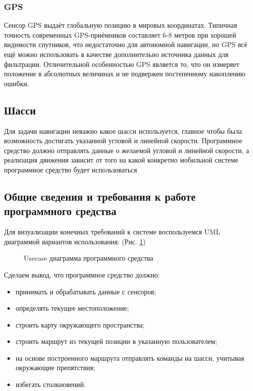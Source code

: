 {\subsubsection{GPS}
Сенсор GPS выдаёт глобальную позицию в мировых координатах. Типичная точность
современных GPS-приёмников составляет 6-8 метров при хорошей видимости
спутников, что недостаточно для автономной навигации, но GPS всё ещё можно
использовать в качестве дополнительно источника данных для фильтрации.
Отличительной особенностью GPS является то, что он измеряет положение в
абсолютных величинах и не подвержен постепенному накоплению ошибки.

\subsection{Шасси}
Для задачи навигации неважно какое шасси используется, главное чтобы была
возможность достигать указанной угловой и линейной скорости. Программное
средство должно отправлять данные о желаемой угловой и линейной скорости, а
реализация движения зависит от того на какой конкретно мобильной системе
программное средство будет использоваться

\subsection{Общие сведения и требования к работе программного средства}

Для визуализации конечных требований к системе воспользуемся UML диаграммой
вариантов использования. (Рис. \ref{pic:usecase})

\begin{figure}[h]
\centering
\caption{Usecase диаграмма программного средства}
	\label{pic:usecase}
\end{figure}

Сделаем вывод, что программное средство должно:

\begin{itemize}
	\item принимать и обрабатывать данные с сенсоров;
	\item определять текущее местоположение;
	\item строить карту окружающего пространства;
	\item строить маршрут из текущей позиции в указанную пользователем;
	\item на основе построенного маршрута отправлять команды на шасси, учитывая
		окружающие препятствия;
	\item избегать столкновений.
\end{itemize}

}
